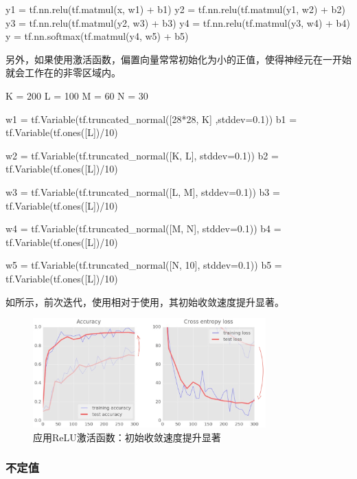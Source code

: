 \begin{content}
\begin{leftbar}
\begin{python}
y1 = tf.nn.relu(tf.matmul(x,  w1) + b1)
y2 = tf.nn.relu(tf.matmul(y1, w2) + b2)
y3 = tf.nn.relu(tf.matmul(y2, w3) + b3)
y4 = tf.nn.relu(tf.matmul(y3, w4) + b4)
y  = tf.nn.softmax(tf.matmul(y4, w5) + b5)
\end{python}
\end{leftbar}

另外，如果使用激活函数，偏置向量常常初始化为小的正值，使得神经元在一开始就会工作在的非零区域内。

\begin{leftbar}
\begin{python}
K = 200
L = 100
M = 60
N = 30

w1 = tf.Variable(tf.truncated_normal([28*28, K] ,stddev=0.1)) 
b1 = tf.Variable(tf.ones([L])/10)

w2 = tf.Variable(tf.truncated_normal([K, L], stddev=0.1))
b2 = tf.Variable(tf.ones([L])/10)

w3 = tf.Variable(tf.truncated_normal([L, M], stddev=0.1)) 
b3 = tf.Variable(tf.ones([L])/10)

w4 = tf.Variable(tf.truncated_normal([M, N], stddev=0.1)) 
b4 = tf.Variable(tf.ones([L])/10)

w5 = tf.Variable(tf.truncated_normal([N, 10], stddev=0.1)) 
b5 = tf.Variable(tf.ones([L])/10)
\end{python}
\end{leftbar}

如所示，前次迭代，使用相对于使用，其初始收敛速度提升显著。

\begin{figure}[H]
\centering
\includegraphics[width=0.8\textwidth]{figures/mnist-sigmoid-to-relu.png}
\caption{应用ReLU激活函数：初始收敛速度提升显著}
 \label{fig:mnist-sigmoid-to-relu}
\end{figure}

\subsubsection{不定值}


\end{content}
